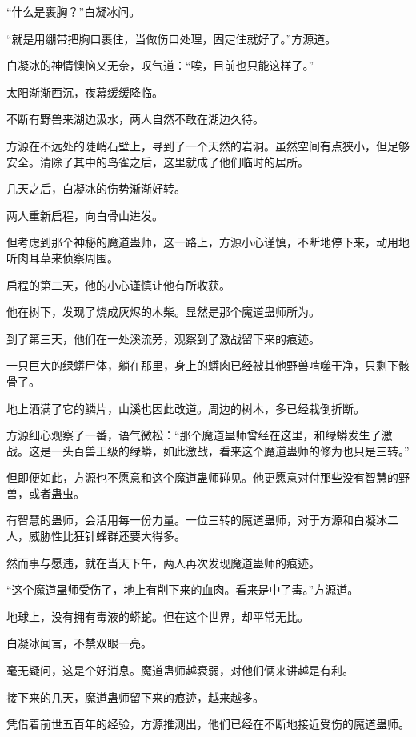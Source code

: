 \begin{this_body}
“什么是裹胸？”白凝冰问。

“就是用绷带把胸口裹住，当做伤口处理，固定住就好了。”方源道。

白凝冰的神情懊恼又无奈，叹气道：“唉，目前也只能这样了。”

太阳渐渐西沉，夜幕缓缓降临。

不断有野兽来湖边汲水，两人自然不敢在湖边久待。

方源在不远处的陡峭石壁上，寻到了一个天然的岩洞。虽然空间有点狭小，但足够安全。清除了其中的鸟雀之后，这里就成了他们临时的居所。

几天之后，白凝冰的伤势渐渐好转。

两人重新启程，向白骨山进发。

但考虑到那个神秘的魔道蛊师，这一路上，方源小心谨慎，不断地停下来，动用地听肉耳草来侦察周围。

启程的第二天，他的小心谨慎让他有所收获。

他在树下，发现了烧成灰烬的木柴。显然是那个魔道蛊师所为。

到了第三天，他们在一处溪流旁，观察到了激战留下来的痕迹。

一只巨大的绿蟒尸体，躺在那里，身上的蟒肉已经被其他野兽啃噬干净，只剩下骸骨了。

地上洒满了它的鳞片，山溪也因此改道。周边的树木，多已经栽倒折断。

方源细心观察了一番，语气微松：“那个魔道蛊师曾经在这里，和绿蟒发生了激战。这是一头百兽王级的绿蟒，如此激战，看来这个魔道蛊师的修为也只是三转。”

但即便如此，方源也不愿意和这个魔道蛊师碰见。他更愿意对付那些没有智慧的野兽，或者蛊虫。

有智慧的蛊师，会活用每一份力量。一位三转的魔道蛊师，对于方源和白凝冰二人，威胁性比狂针蜂群还要大得多。

然而事与愿违，就在当天下午，两人再次发现魔道蛊师的痕迹。

“这个魔道蛊师受伤了，地上有削下来的血肉。看来是中了毒。”方源道。

地球上，没有拥有毒液的蟒蛇。但在这个世界，却平常无比。

白凝冰闻言，不禁双眼一亮。

毫无疑问，这是个好消息。魔道蛊师越衰弱，对他们俩来讲越是有利。

接下来的几天，魔道蛊师留下来的痕迹，越来越多。

凭借着前世五百年的经验，方源推测出，他们已经在不断地接近受伤的魔道蛊师。


\end{this_body}
